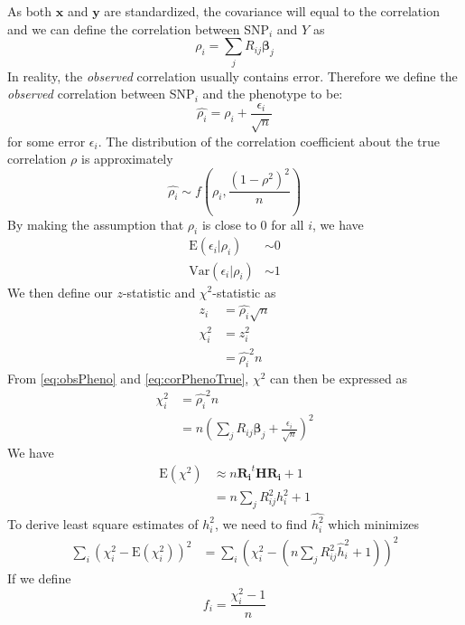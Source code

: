 			As both $\boldsymbol{x}$ and $\boldsymbol{y}$ are standardized, the covariance will equal to the correlation and we can define the correlation between \gls{SNP}$_i$ and $Y$ as
			\begin{equation}
				\rho_i = \sum_j{R_{ij}\boldsymbol{\beta}_j}
				\label{eq:corPhenoTrue}
			\end{equation}
			In reality, the \emph{observed} correlation usually contains error. 
			Therefore we define the \emph{observed} correlation between \gls{SNP}$_i$ and the phenotype to be:
			\begin{equation}
			\hat{\rho_i} = \rho_i+\frac{\epsilon_i}{\sqrt{n}}
			\label{eq:obsPheno}
			\end{equation}
			for some error $\epsilon_i$. 
			The distribution of the correlation coefficient about the true correlation $\rho$ is approximately
			$$
				\hat{\rho_i}\sim f(\rho_i, \frac{(1-\rho^2)^2}{n})
			$$
			By making the assumption that $\rho_i$ is close to 0 for all $i$, we have 
			\begin{align*}
				\mathrm{E}(\epsilon_i|\rho_i)&\sim 0\\
				\mathrm{Var}(\epsilon_i|\rho_i)&\sim 1
			\end{align*}
			We then define our $z$-statistic and $\chi^2$-statistic as
			\begin{align*}
				z_i &= \hat{\rho_i}\sqrt{n} \\
				\chi^2_i &= z_i^2\\
				&=\hat{\rho_i}^2n
			\end{align*}
			From \cref{eq:obsPheno} and \cref{eq:corPhenoTrue}, $\chi^2$ can then be expressed as
			\begin{align*}
			\chi^2_i&=\hat{\rho_i}^2n\\
			&=n(\sum_j{R_{ij}\boldsymbol{\beta}_j}+\frac{\epsilon_i}{\sqrt{n}})^2
			\end{align*}
			We have
			\begin{align*}
			\mathrm{E}(\chi^2) &\approx n\boldsymbol{R_i}^t\boldsymbol{HR_i}+1 \nonumber\\
			&=n\sum_j{R^2_{ij}h_i^2}+1
			\end{align*}
			To derive least square estimates of $h_i^2$, we need to find $\hat{h_i^2}$ which minimizes
			\begin{align*}
				\sum_i(\chi_i^2-\mathrm{E}(\chi_i^2))^2&=\sum_i(\chi_i^2-(n\sum_j{R^2_{ij}\hat{h}_i^2}+1))^2
			\end{align*}
			If we define 
			\begin{equation}
			f_i= \frac{\chi_i^2-1}{n}
			\label{eq:defineF}
			\end{equation}
